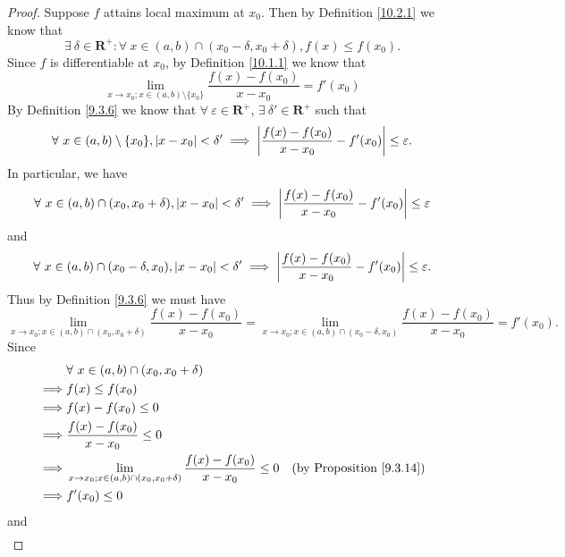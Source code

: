 \begin{proof}
    Suppose \(f\) attains local maximum at \(x_0\).
    Then by Definition \ref{10.2.1} we know that
    \[
        \exists\ \delta \in \mathbf{R}^+ : \forall\ x \in (a, b) \cap (x_0 - \delta, x_0 + \delta), f(x) \leq f(x_0).
    \]
    Since \(f\) is differentiable at \(x_0\), by Definition \ref{10.1.1} we know that
    \[
        \lim_{x \to x_0 ; x \in (a, b) \setminus \{x_0\}} \frac{f(x) - f(x_0)}{x - x_0} = f'(x_0)
    \]
    By Definition \ref{9.3.6} we know that \(\forall\ \varepsilon \in \mathbf{R}^+\), \(\exists\ \delta' \in \mathbf{R}^+\) such that
    \[
        \forall\ x \in (a, b) \setminus \{x_0\}, \abs*{x - x_0} < \delta' \implies \abs*{\frac{f(x) - f(x_0)}{x - x_0} - f'(x_0)} \leq \varepsilon.
    \]
    In particular, we have
    \[
        \forall\ x \in (a, b) \cap (x_0, x_0 + \delta), \abs*{x - x_0} < \delta' \implies \abs*{\frac{f(x) - f(x_0)}{x - x_0} - f'(x_0)} \leq \varepsilon
    \]
    and
    \[
        \forall\ x \in (a, b) \cap (x_0 - \delta, x_0), \abs*{x - x_0} < \delta' \implies \abs*{\frac{f(x) - f(x_0)}{x - x_0} - f'(x_0)} \leq \varepsilon.
    \]
    Thus by Definition \ref{9.3.6} we must have
    \[
        \lim_{x \to x_0 ; x \in (a, b) \cap (x_0, x_0 + \delta)} \frac{f(x) - f(x_0)}{x - x_0} = \lim_{x \to x_0 ; x \in (a, b) \cap (x_0 - \delta, x_0)} \frac{f(x) - f(x_0)}{x - x_0} = f'(x_0).
    \]
    Since
    \begin{align*}
                 & \forall\ x \in (a, b) \cap (x_0, x_0 + \delta)                                                                                       \\
        \implies & f(x) \leq f(x_0)                                                                                                                     \\
        \implies & f(x) - f(x_0) \leq 0                                                                                                                 \\
        \implies & \frac{f(x) - f(x_0)}{x - x_0} \leq 0                                                                                                 \\
        \implies & \lim_{x \to x_0 ; x \in (a, b) \cap (x_0, x_0 + \delta)} \frac{f(x) - f(x_0)}{x - x_0} \leq 0 & \text{(by Proposition \ref{9.3.14})} \\
        \implies & f'(x_0) \leq 0
    \end{align*}
    and
    \begin{align*}

\end{align*}
\end{proof}
